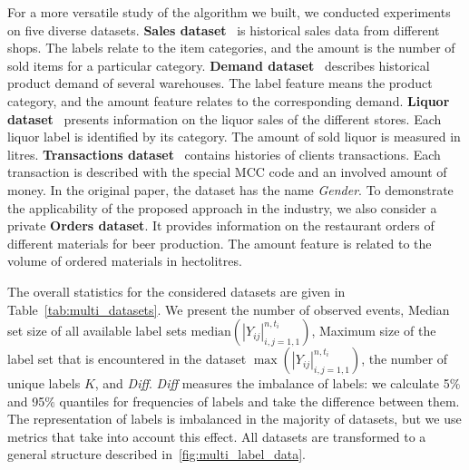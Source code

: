 \documentclass[runningheads]{llncs}
\begin{document}
For a more versatile study of the algorithm we built, we conducted experiments on five diverse datasets. 
\textbf{Sales dataset}~\cite{sales} is historical sales data from different shops. The labels relate to the item categories, and the amount is the number of sold items for a particular category. 
\textbf{Demand dataset}~\cite{demand} describes historical product demand of several warehouses. The label feature means the product category, and the amount feature relates to the corresponding demand.
\textbf{Liquor dataset}~\cite{liquor} presents information on the liquor sales of the different stores. Each liquor label is identified by its category. The amount of sold liquor is measured in litres.
\textbf{Transactions dataset}~\cite{gender} contains histories of clients transactions. Each transaction is described with the special MCC code and an involved amount of money. In the original paper, the dataset has the name \textit{Gender}.
To demonstrate the applicability of the proposed approach in the industry, we also consider a private \textbf{Orders dataset}. 
It provides information on the restaurant orders of different materials for beer production. The amount feature is related to the volume of ordered materials in hectolitres. 

The overall statistics for the considered datasets are given in Table~\ref{tab:multi_datasets}.
We present the number of observed events, Median set size of all available label sets $\mathrm{median}({|Y_{ij}|}_{i, j = 1, 1}^{n, t_i})$, Maximum size of the label set that is encountered in the dataset $\max({|Y_{ij}|}_{i, j = 1, 1}^{n, t_i})$, the number of unique labels $K$, and \textit{Diff}. 
\textit{Diff} measures the imbalance of labels: we calculate 5$\%$ and 95$\%$ quantiles for frequencies of labels and take the difference between them.
The representation of labels is imbalanced in the majority of datasets, but we use metrics that take into account this effect.
All datasets are transformed to a general structure described in~\autoref{fig:multi_label_data}.

\end{document}
